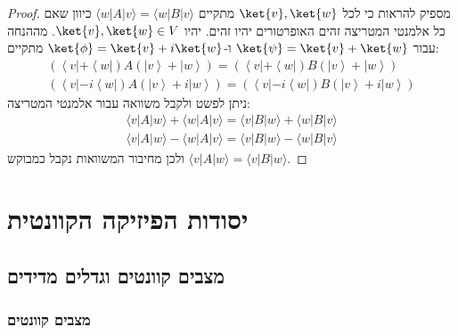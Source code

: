 \documentclass{tstextbook}
\begin{document}
\begin{proof}
מספיק להראות כי לכל \(\ket{v},\ket{w}\) מתקיים \(\langle w|A|v \rangle=\langle w|B|v \rangle\) כיוון שאם כל אלמנטי המטריצה זהים האופרטורים יהיו זהים.
יהיו \(\ket{v},\ket{w}\in V\). מההנחה עבור \(\ket{\psi}=\ket{v}+\ket{w}\) ו-\(\ket{\phi}=\ket{v}+i\ket{w}\) מתקיים:
\begin{gather*}\left(\left\langle  v|+\left\langle  w|\right)A\left(|v \right\rangle+|w \right\rangle\right)=\left(\left\langle  v|+\left\langle  w|\right)B\left(|v \right\rangle+|w \right\rangle\right)\\\left(\left\langle  v|-i\left\langle  w|\right)A\left(|v \right\rangle+i|w \right\rangle\right)=\left(\left\langle  v|-i\left\langle  w|\right)B\left(|v \right\rangle+i|w \right\rangle\right) 
\end{gather*}
ניתן לפשט ולקבל משוואה עבור אלמנטי המטריצה:
\begin{gather*}\langle v|A|w\rangle+\langle w|A|v\rangle=\langle v|B|w\rangle+\langle w|B|v\rangle \\\langle v|A|w\rangle-\langle w|A|v\rangle=\langle v|B|w\rangle-\langle w|B|v\rangle
\end{gather*}
ולכן מחיבור המשוואות נקבל כמבוקש \(\langle v|A|w \rangle=\langle v|B|w \rangle\).

\end{proof}
\chapter{יסודות הפיזיקה הקוונטית}

\section{מצבים קוונטים וגדלים מדידים}

\subsection{מצבים קוונטים}
\end{document}
